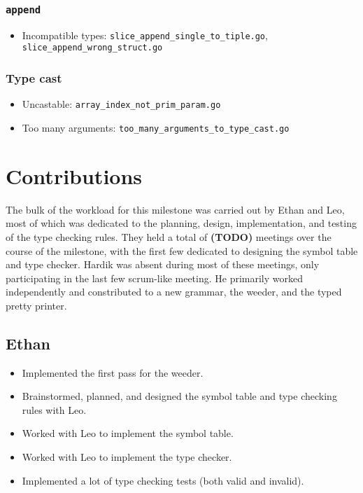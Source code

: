 \documentclass{article}
\begin{document}
\subsubsection*{\texttt{append}}

\begin{itemize}
\item Incompatible types: \texttt{slice_append_single_to_tiple.go}, \texttt{slice_append_wrong_struct.go}
\end{itemize}

\subsubsection*{Type cast}

\begin{itemize}
\item Uncastable: \texttt{array_index_not_prim_param.go}
\item Too many arguments: \texttt{too_many_arguments_to_type_cast.go}
\end{itemize}

\section*{Contributions}

The bulk of the workload for this milestone was carried out by Ethan and Leo, most of which was dedicated to the planning, design, implementation, and testing of the type checking rules.
They held a total of \textbf{(TODO)} meetings over the course of the milestone, with the first few dedicated to designing the symbol table and type checker.
Hardik was absent during most of these meetings, only participating in the last few scrum-like meeting.
He primarily worked independently and constributed to a new grammar, the weeder, and the typed pretty printer.

\subsection*{Ethan}

\begin{itemize}
    \item Implemented the first pass for the weeder.
    \item Brainstormed, planned, and designed the symbol table and type checking rules with Leo.
    \item Worked with Leo to implement the symbol table.
    \item Worked with Leo to implement the type checker.
    \item Implemented a lot of type checking tests (both valid and invalid).
\end{itemize}
\end{document}
